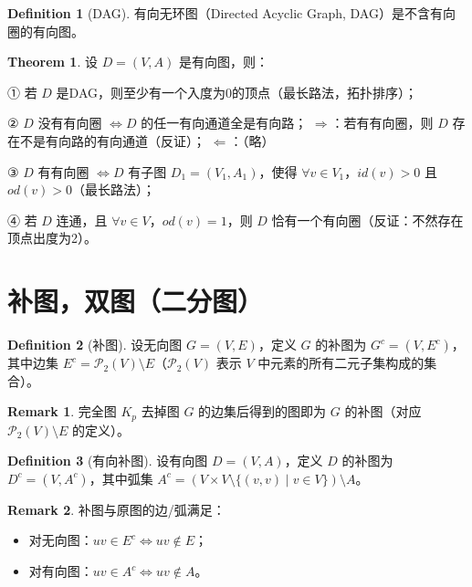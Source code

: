 \documentclass[oneside]{book}
\theoremstyle{definition}
\newtheorem{definition}{Definition}[section]
\newtheorem{theorem}{Theorem}[section]
\newtheorem{remark}{Remark}[section]
\begin{document}
\begin{definition}[DAG]
	有向无环图（Directed Acyclic Graph, DAG）是不含有向圈的有向图。
\end{definition}

\begin{theorem}
	设 \( D=(V,A) \) 是有向图，则：
	
	① 若 \( D \) 是DAG，则至少有一个入度为0的顶点（最长路法，拓扑排序）；
	
	② \( D \) 没有有向圈 \( \iff D \) 的任一有向通道全是有向路；
	\( \Rightarrow \)：若有有向圈，则 \( D \) 存在不是有向路的有向通道（反证）；
	\( \Leftarrow \)：（略）
	
	③ \( D \) 有有向圈 \( \iff D \) 有子图 \( D_1=(V_1,A_1) \)，使得 \( \forall v \in V_1 \)，\( id(v)>0 \) 且 \( od(v)>0 \)（最长路法）；
	
	④ 若 \( D \) 连通，且 \( \forall v \in V \)，\( od(v)=1 \)，则 \( D \) 恰有一个有向圈（反证：不然存在顶点出度为2）。
\end{theorem}

\section{补图，双图（二分图）}
\begin{definition}[补图]
	设无向图 \( G = (V, E) \)，定义 \( G \) 的补图为 \( G^c = (V, E^c) \)，其中边集 \( E^c = \mathcal{P}_2(V) \setminus E \)（\( \mathcal{P}_2(V) \) 表示 \( V \) 中元素的所有二元子集构成的集合）。
\end{definition}
\begin{remark}
	完全图 \( K_p \) 去掉图 \( G \) 的边集后得到的图即为 \( G \) 的补图（对应 \( \mathcal{P}_2(V) \setminus E \) 的定义）。
\end{remark}

\begin{definition}[有向补图]
	设有向图 \( D = (V, A) \)，定义 \( D \) 的补图为 \( D^c = (V, A^c) \)，其中弧集 \( A^c = (V \times V \setminus \{ (v, v) \mid v \in V \}) \setminus A \)。
\end{definition}

\begin{remark}
	补图与原图的边/弧满足：
	\begin{itemize}
		\item 对无向图：\( uv \in E^c \iff uv \notin E \)；
		\item 对有向图：\( uv \in A^c \iff uv \notin A \)。
	\end{itemize}
\end{remark}
\end{document}
